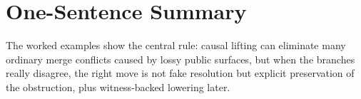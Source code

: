 \documentclass[11pt]{article}
\theoremstyle{definition}
\begin{document}
\section{One-Sentence Summary}

The worked examples show the central rule: causal lifting can eliminate many
ordinary merge conflicts caused by lossy public surfaces, but when the branches
really disagree, the right move is not fake resolution but explicit preservation
of the obstruction, plus witness-backed lowering later.
\end{document}
